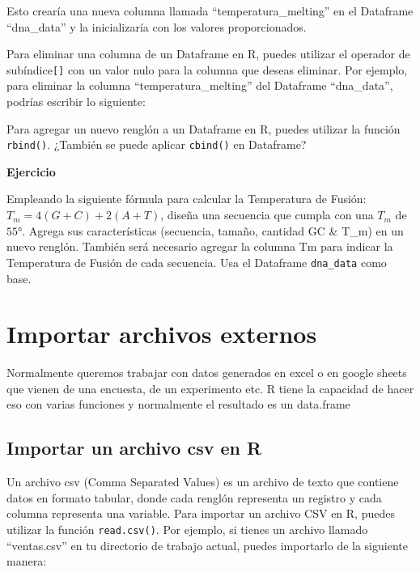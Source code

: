 \documentclass[
]{book}
\newenvironment{Shaded}{\begin{snugshade}}{\end{snugshade}}
\newcommand{\ConstantTok}[1]{\textcolor[rgb]{0.56,0.35,0.01}{#1}}
\newcommand{\NormalTok}[1]{#1}
\newcommand{\OtherTok}[1]{\textcolor[rgb]{0.56,0.35,0.01}{#1}}
\newcommand{\SpecialCharTok}[1]{\textcolor[rgb]{0.81,0.36,0.00}{\textbf{#1}}}
\begin{document}
Esto crearía una nueva columna llamada ``temperatura\_melting'' en el Dataframe ``dna\_data'' y la inicializaría con los valores proporcionados.

Para eliminar una columna de un Dataframe en R, puedes utilizar el operador de subíndice\texttt{{[}{]}} con un valor nulo para la columna que deseas eliminar. Por ejemplo, para eliminar la columna ``temperatura\_melting'' del Dataframe ``dna\_data'', podrías escribir lo siguiente:

\begin{Shaded}
\end{Shaded}

Para agregar un nuevo renglón a un Dataframe en R, puedes utilizar la función \texttt{rbind()}. ¿También se puede aplicar \texttt{cbind()} en Dataframe?

\textbf{Ejercicio}

Empleando la siguiente fórmula para calcular la Temperatura de Fusión: \(T_m=4(G+C)+2(A+T)\), diseña una secuencia que cumpla con una \(T_m\) de \(55°\). Agrega sus características (secuencia, tamaño, cantidad GC \& T\_m) en un nuevo renglón. También será necesario agregar la columna Tm para indicar la Temperatura de Fusión de cada secuencia. Usa el Dataframe \texttt{dna\_data} como base.

\section{Importar archivos externos}\label{importar-archivos-externos}

Normalmente queremos trabajar con datos generados en excel o en google sheets que vienen de una encuesta, de un experimento etc. R tiene la capacidad de hacer eso con varias funciones y normalmente el resultado es un data.frame

\subsection{Importar un archivo csv en R}\label{importar-un-archivo-csv-en-r}

Un archivo csv (Comma Separated Values) es un archivo de texto que contiene datos en formato tabular, donde cada renglón representa un registro y cada columna representa una variable. Para importar un archivo CSV en R, puedes utilizar la función \texttt{read.csv()}. Por ejemplo, si tienes un archivo llamado ``ventas.csv'' en tu directorio de trabajo actual, puedes importarlo de la siguiente manera:
\end{document}
